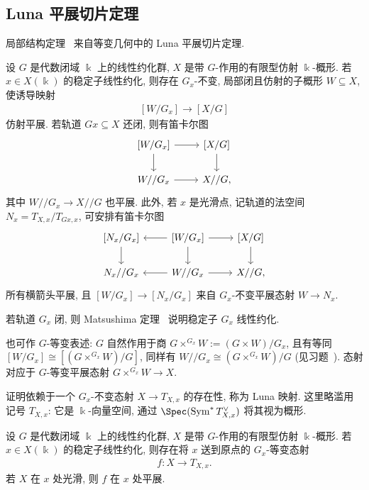 \subsection{Luna 平展切片定理}\label{src:7.7.1-subsection}
局部结构定理~ 来自等变几何中的 Luna 平展切片定理.
\begin{theorem}\label{src:7.7.5}
设 $G$ 是代数闭域 $\Bbbk$ 上的线性约化群, $X$ 是带 $G$-作用的有限型仿射 $\Bbbk$-概形. 若 $x\in X(\Bbbk)$ 的稳定子线性约化, 则存在 $G_x$-不变, 局部闭且仿射的子概形 $W\subseteq X$, 使诱导映射
\begin{align}\label{src:7.7.6}
[W/G_x]\longrightarrow[X/G]
\end{align}
仿射平展. 若轨道 $Gx\subseteq X$ 还闭, 则有笛卡尔图
\begin{align*}
\begin{tikzcd}[ampersand replacement=\&]
{[W/G_x]}\arrow[r]\arrow[d]\&{[X/G]}\arrow[d]\\
W//G_x\arrow[r]\&X//G,
\end{tikzcd}
\end{align*}
其中 $W//G_x\to X//G$ 也平展. 此外, 若 $x$ 是光滑点, 记轨道的法空间 $N_x=T_{X,x}/T_{Gx,x}$, 可安排有笛卡尔图
\begin{align*}
\begin{tikzcd}[ampersand replacement=\&]
{[N_x/G_x]}\arrow[d]\&{[W/G_x]}\arrow[l]\arrow[r]\arrow[d]\&{[X/G]}\arrow[d]\\
N_x//G_x\&W//G_x\arrow[l]\arrow[r]\&X//G,
\end{tikzcd}
\end{align*}
所有横箭头平展, 且 $[W/G_x]\to[N_x/G_x]$ 来自 $G_x$-不变平展态射 $W\to N_x$.
\end{theorem}
\begin{remark}\label{src:7.7.7}
若轨道 $G_x$ 闭, 则 Matsushima 定理~ 说明稳定子 $G_x$ 线性约化.
\end{remark}
\begin{remark}\label{src:7.7.8}
也可作 $G$-等变表述: $G$ 自然作用于商 $G\times^{G_x}W:=(G\times W)/G_x$, 且有等同 $[W/G_x]\cong[(G\times^{G_x}W)/G]$, 同样有 $W//G_x\cong(G\times^{G_x}W)/G$ (见习题~). 态射  对应于 $G$-等变平展态射 $G\times^{G_x}W\to X$.
\end{remark}
证明依赖于一个 $G_x$-不变态射 $X\to T_{X,x}$ 的存在性, 称为 Luna 映射. 这里略滥用记号 $T_{X,x}$: 它是 $\Bbbk$-向量空间, 通过 $\Spec(\operatorname{Sym}^*T_{X,x}^\vee)$ 将其视为概形.
\begin{lemma}[Luna 映射]\label{src:7.7.9}
设 $G$ 是代数闭域 $\Bbbk$ 上的线性约化群, $X$ 是带 $G$-作用的有限型仿射 $\Bbbk$-概形. 若 $x\in X(\Bbbk)$ 的稳定子线性约化, 则存在将 $x$ 送到原点的 $G_x$-等变态射
\begin{align}\label{src:7.7.10}
f:X\longrightarrow T_{X,x}.
\end{align}
若 $X$ 在 $x$ 处光滑, 则 $f$ 在 $x$ 处平展.
\end{lemma}

